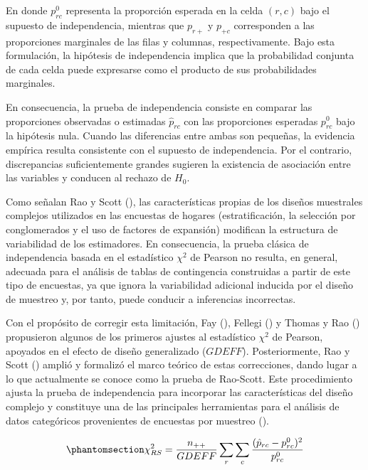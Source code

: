 \documentclass[
  spanish,
  11pt,
  letterpaper,
  oneside,
  open=any]{scrbook}
\begin{document}
En donde \(p_{rc}^0\) representa la proporción esperada en la celda
\((r,c)\) bajo el supuesto de independencia, mientras que \(p_{r+}\) y
\(p_{+c}\) corresponden a las proporciones marginales de las filas y
columnas, respectivamente. Bajo esta formulación, la hipótesis de
independencia implica que la probabilidad conjunta de cada celda puede
expresarse como el producto de sus probabilidades marginales.

En consecuencia, la prueba de independencia consiste en comparar las
proporciones observadas o estimadas \(\hat{p}_{rc}\) con las
proporciones esperadas \(p_{rc}^0\) bajo la hipótesis nula. Cuando las
diferencias entre ambas son pequeñas, la evidencia empírica resulta
consistente con el supuesto de independencia. Por el contrario,
discrepancias suficientemente grandes sugieren la existencia de
asociación entre las variables y conducen al rechazo de \(H_0\).

Como señalan Rao y Scott (), las
características propias de los diseños muestrales complejos utilizados
en las encuestas de hogares (estratificación, la selección por
conglomerados y el uso de factores de expansión) modifican la estructura
de variabilidad de los estimadores. En consecuencia, la prueba clásica
de independencia basada en el estadístico \(\chi^2\) de Pearson no
resulta, en general, adecuada para el análisis de tablas de contingencia
construidas a partir de este tipo de encuestas, ya que ignora la
variabilidad adicional inducida por el diseño de muestreo y, por tanto,
puede conducir a inferencias incorrectas.

Con el propósito de corregir esta limitación, Fay
(), Fellegi
() y Thomas y Rao
() propusieron algunos de los
primeros ajustes al estadístico \(\chi^2\) de Pearson, apoyados en el
efecto de diseño generalizado (\(GDEFF\)). Posteriormente, Rao y Scott
() amplió y formalizó el marco
teórico de estas correcciones, dando lugar a lo que actualmente se
conoce como la prueba de Rao-Scott. Este procedimiento ajusta la prueba
de independencia para incorporar las características del diseño complejo
y constituye una de las principales herramientas para el análisis de
datos categóricos provenientes de encuestas por muestreo
().

\begin{equation}\protect\phantomsection\label{eq-rao-scott}{
\chi_{RS}^2 = \frac{n_{++}}{GDEFF} \sum_r \sum_c \frac{(\hat{p}_{rc} - p_{rc}^0)^2}{p_{rc}^0}
}\end{equation}
\end{document}
